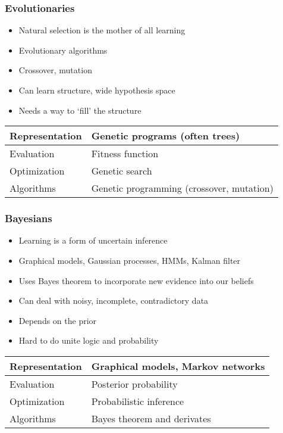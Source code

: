 \documentclass[UTF8,11pt,colorlinks,compress,openany]{beamer}%
\begin{document}
\begin{frame}\frametitle{Evolutionaries}
\begin{itemize}
	\item Natural selection is the mother of all learning
	\item Evolutionary algorithms
	\item Crossover, mutation
	\item Can learn structure, wide hypothesis space
	\item Needs a way to `fill' the structure
\end{itemize}
\begin{table}
\begin{tabu}{l|l}
\hline
Representation &Genetic programs (often trees)\\
\hline
Evaluation &Fitness function\\
\hline
Optimization &Genetic search\\
\hline
Algorithms &Genetic programming (crossover, mutation)\\
\hline
\end{tabu}
\end{table}
\end{frame}

\begin{frame}\frametitle{Bayesians}
\begin{itemize}
	\item Learning is a form of uncertain inference
	\item Graphical models, Gaussian processes, HMMs, Kalman filter
	\item Uses Bayes theorem to incorporate new evidence into our beliefs
	\item Can deal with noisy, incomplete, contradictory data
	\item Depends on the prior
	\item Hard to do unite logic and probability
\end{itemize}
\begin{table}
\begin{tabu}{l|l}
\hline
Representation &Graphical models, Markov networks\\
\hline
Evaluation &Posterior probability\\
\hline
Optimization &Probabilistic inference\\
\hline
Algorithms &Bayes theorem and derivates\\
\hline
\end{tabu}
\end{table}
\end{frame}
\end{document}

